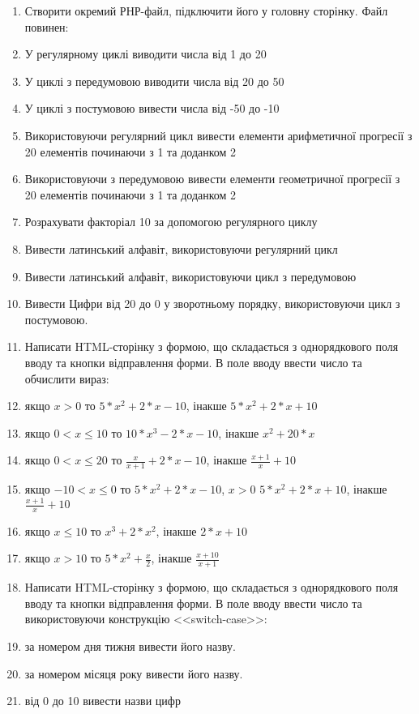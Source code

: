 \begin{enumerate}
 
\item[]Створити окремий РНР-файл, підключити його у головну сторінку. Файл повинен:
\item У регулярному циклі виводити числа від 1 до 20
\item У циклі з передумовою виводити числа від 20 до 50
\item У циклі з постумовою вивести числа від -50 до -10
\item Використовуючи регулярний цикл вивести елементи арифметичної прогресії з 20 елементів починаючи з 1 та доданком 2
\item Використовуючи з передумовою вивести елементи геометричної прогресії з 20 елементів починаючи з 1 та доданком 2
\item Розрахувати факторіал 10 за допомогою регулярного циклу
\item Вивести латинський алфавіт, використовуючи регулярний цикл
\item Вивести латинський алфавіт, використовуючи цикл з передумовою
\item Вивести Цифри від 20 до 0 у зворотньому порядку, використовуючи цикл з постумовою.
\item[]Написати HTML-сторінку з формою, що складається з однорядкового поля вводу та кнопки відправлення форми. В поле вводу ввести число та обчислити вираз: 
\item якщо $x>0$ то $5*x^2 + 2*x - 10$, інакше $5*x^2 + 2*x + 10$
\item якщо $0<x\le 10$ то $10*x^3 - 2*x - 10$, інакше $x^2 + 20*x$
\item якщо $0<x\le 20$ то $\frac{x}{x+1} + 2*x - 10$, інакше $\frac{x+1}{x} + 10$
\item якщо $-10<x\le 0$ то $5*x^2 + 2*x - 10$, $x> 0$ $5*x^2 + 2*x + 10$, інакше $\frac{x+1}{x} + 10$
\item якщо $x\le 10$ то $x^3 + 2*x^2$, інакше $2*x + 10$
\item якщо $x>10$ то $5*x^2 + \frac{x}{2}$, інакше $\frac{x+10}{x+1}$
\item[]Написати HTML-сторінку з формою, що складається з однорядкового поля вводу та кнопки відправлення форми. В поле вводу ввести число та використовуючи конструкцію <<switch-case>>: 
\item за номером дня тижня вивести його назву.
\item за номером місяця року вивести його назву.
\item від 0 до 10 вивести назви цифр

\end{enumerate}
